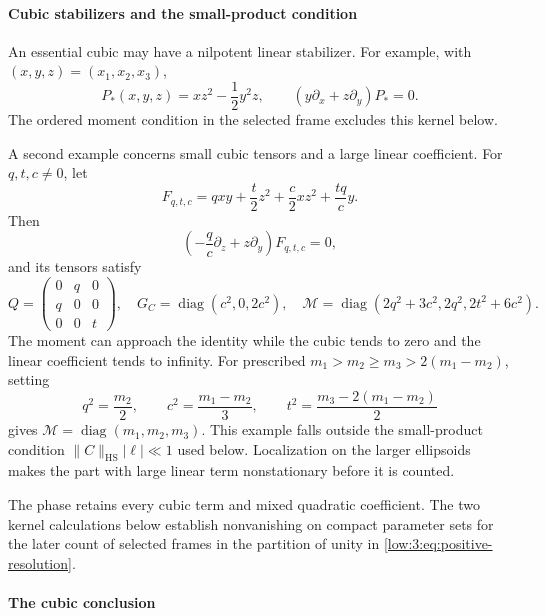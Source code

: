 \documentclass[11pt]{amsart}
\theoremstyle{definition}
\theoremstyle{remark}
\newcommand{\norm}[1]{\lVert #1\rVert}
\newcommand{\abs}[1]{\lvert #1\rvert}
\DeclareMathOperator{\diag}{diag}
\numberwithin{equation}{section}
\begin{document}
\paragraph{Cubic stabilizers and the small-product condition}

An essential cubic may have a nilpotent linear stabilizer. For example, with $(x,y,z)=(x_1,x_2,x_3)$,
\[
P_*(x,y,z)=xz^2-\frac12y^2z,\qquad (y\partial_x+z\partial_y)P_*=0.
\]
The ordered moment condition in the selected frame excludes this kernel below.

A second example concerns small cubic tensors and a large linear coefficient. For $q,t,c\ne0$, let
\begin{equation}\label{low:3:eq:small-counterexample}
F_{q,t,c}=qxy+\frac t2z^2+\frac c2xz^2+\frac{tq}{c}y.
\end{equation}
Then
\begin{equation}\label{low:3:eq:small-counterexample-field}
\left(-\frac q c\partial_z+z\partial_y\right)F_{q,t,c}=0,
\end{equation}
and its tensors satisfy
\begin{equation}\label{low:3:eq:small-counterexample-moment}
Q=\begin{pmatrix}0&q&0\\q&0&0\\0&0&t\end{pmatrix},\quad G_C=\diag(c^2,0,2c^2),\quad \mathscr M=\diag(2q^2+3c^2,2q^2,2t^2+6c^2).
\end{equation}
The moment can approach the identity while the cubic tends to zero and the linear coefficient tends to infinity. For prescribed $m_1>m_2\geq m_3>2(m_1-m_2)$, setting
\[
q^2=\frac{m_2}{2},\qquad c^2=\frac{m_1-m_2}{3},\qquad t^2=\frac{m_3-2(m_1-m_2)}2
\]
gives $\mathscr M=\diag(m_1,m_2,m_3)$. This example falls outside the small-product condition $\norm C_{\mathrm{HS}}\abs\ell\ll1$ used below. Localization on the larger ellipsoids makes the part with large linear term nonstationary before it is counted.

The phase retains every cubic term and mixed quadratic coefficient. The two kernel calculations below establish nonvanishing on compact parameter sets for the later count of selected frames in the partition of unity in \eqref{low:3:eq:positive-resolution}.

\paragraph{The cubic conclusion}
\end{document}
